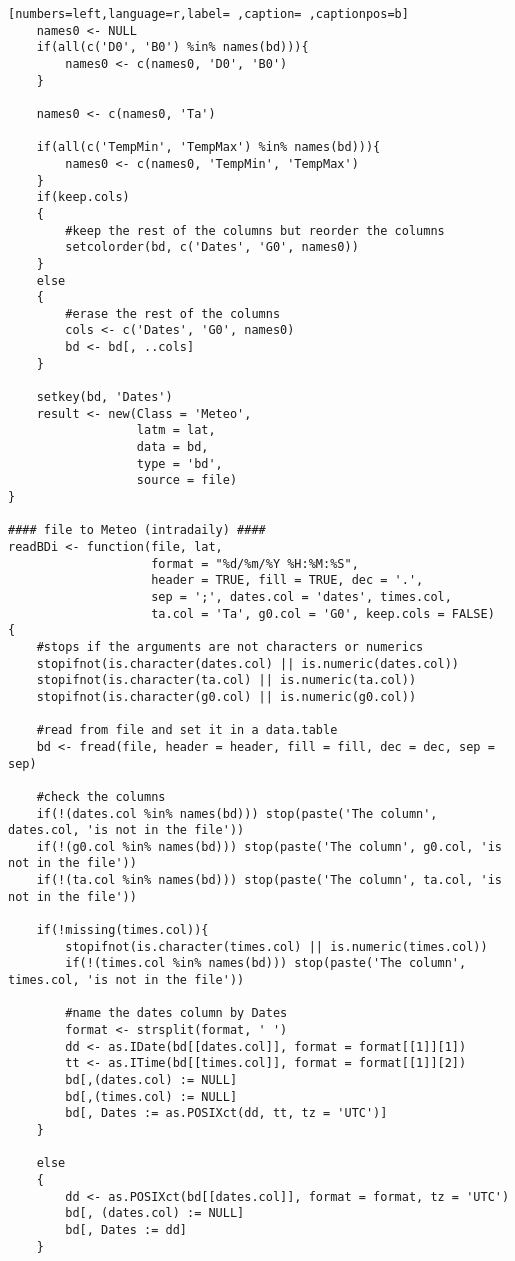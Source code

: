 \begin{lstlisting}[numbers=left,language=r,label= ,caption= ,captionpos=b]
    names0 <- NULL
    if(all(c('D0', 'B0') %in% names(bd))){
        names0 <- c(names0, 'D0', 'B0')
    }

    names0 <- c(names0, 'Ta')

    if(all(c('TempMin', 'TempMax') %in% names(bd))){
        names0 <- c(names0, 'TempMin', 'TempMax')
    }
    if(keep.cols)
    {
        #keep the rest of the columns but reorder the columns
        setcolorder(bd, c('Dates', 'G0', names0))
    }
    else
    {
        #erase the rest of the columns
        cols <- c('Dates', 'G0', names0)
        bd <- bd[, ..cols]
    }

    setkey(bd, 'Dates')
    result <- new(Class = 'Meteo',
                  latm = lat,
                  data = bd,
                  type = 'bd',
                  source = file)
}

#### file to Meteo (intradaily) ####
readBDi <- function(file, lat,
                    format = "%d/%m/%Y %H:%M:%S",
                    header = TRUE, fill = TRUE, dec = '.',
                    sep = ';', dates.col = 'dates', times.col,
                    ta.col = 'Ta', g0.col = 'G0', keep.cols = FALSE)
{
    #stops if the arguments are not characters or numerics
    stopifnot(is.character(dates.col) || is.numeric(dates.col))
    stopifnot(is.character(ta.col) || is.numeric(ta.col))
    stopifnot(is.character(g0.col) || is.numeric(g0.col))

    #read from file and set it in a data.table
    bd <- fread(file, header = header, fill = fill, dec = dec, sep = sep)

    #check the columns
    if(!(dates.col %in% names(bd))) stop(paste('The column', dates.col, 'is not in the file'))
    if(!(g0.col %in% names(bd))) stop(paste('The column', g0.col, 'is not in the file'))
    if(!(ta.col %in% names(bd))) stop(paste('The column', ta.col, 'is not in the file'))

    if(!missing(times.col)){
        stopifnot(is.character(times.col) || is.numeric(times.col))
        if(!(times.col %in% names(bd))) stop(paste('The column', times.col, 'is not in the file'))

        #name the dates column by Dates
        format <- strsplit(format, ' ')
        dd <- as.IDate(bd[[dates.col]], format = format[[1]][1])
        tt <- as.ITime(bd[[times.col]], format = format[[1]][2])
        bd[,(dates.col) := NULL]
        bd[,(times.col) := NULL]
        bd[, Dates := as.POSIXct(dd, tt, tz = 'UTC')]
    }

    else
    {
        dd <- as.POSIXct(bd[[dates.col]], format = format, tz = 'UTC')
        bd[, (dates.col) := NULL]
        bd[, Dates := dd]
    }


\end{lstlisting}

